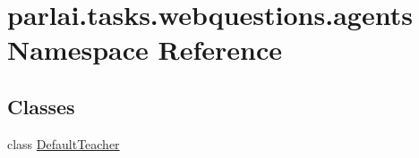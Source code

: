 \hypertarget{namespaceparlai_1_1tasks_1_1webquestions_1_1agents}{}\section{parlai.\+tasks.\+webquestions.\+agents Namespace Reference}
\label{namespaceparlai_1_1tasks_1_1webquestions_1_1agents}
\subsection*{Classes}
\begin{DoxyCompactItemize}
\item 
class \hyperlink{classparlai_1_1tasks_1_1webquestions_1_1agents_1_1DefaultTeacher}{Default\+Teacher}
\end{DoxyCompactItemize}
